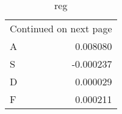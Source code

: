 \begin{longtable}[H]{lr}
\caption{reg} \label{tab:reg} \\
\toprule
\midrule
\endfirsthead
\caption[]{reg} \\
\toprule
\midrule
\endhead
\midrule
\multicolumn{2}{r}{Continued on next page} \\
\midrule
\endfoot
\bottomrule
\endlastfoot
A & 0.008080 \\
S & -0.000237 \\
D & 0.000029 \\
F & 0.000211 \\
\end{longtable}
